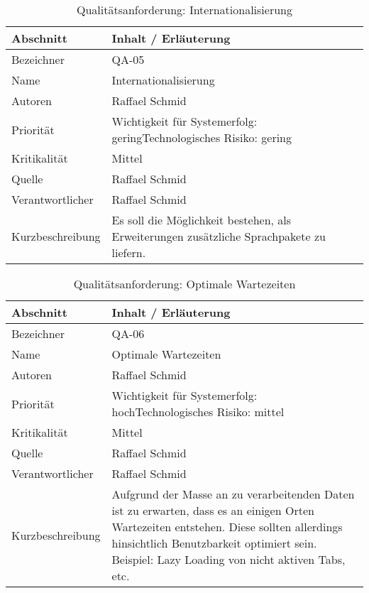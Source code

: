 \begin{longtable}{|p{4cm}|p{10.5cm}|}
    \caption{Qualitätsanforderung: Internationalisierung}\\\hline
   \textbf{Abschnitt} & \textbf{Inhalt / Erläuterung} \\\hline
   Bezeichner & QA-05\\\hline
   Name & Internationalisierung\\\hline
   Autoren & Raffael Schmid\\\hline
   Priorität & Wichtigkeit für Systemerfolg: gering\newline Technologisches Risiko: gering\\\hline
   Kritikalität & Mittel\\\hline
   Quelle & Raffael Schmid\\\hline
   Verantwortlicher & Raffael Schmid\\\hline
   Kurzbeschreibung & Es soll die Möglichkeit bestehen, als Erweiterungen zusätzliche Sprachpakete zu liefern.\\\hline
\end{longtable}

\begin{longtable}{|p{4cm}|p{10.5cm}|}
    \caption{Qualitätsanforderung: Optimale Wartezeiten}\\\hline
   \textbf{Abschnitt} & \textbf{Inhalt / Erläuterung} \\\hline
   Bezeichner & QA-06\\\hline
   Name & Optimale Wartezeiten\\\hline
   Autoren & Raffael Schmid\\\hline
   Priorität & Wichtigkeit für Systemerfolg: hoch\newline Technologisches Risiko: mittel\\\hline
   Kritikalität & Mittel\\\hline
   Quelle & Raffael Schmid\\\hline
   Verantwortlicher & Raffael Schmid\\\hline
   Kurzbeschreibung & Aufgrund der Masse an zu verarbeitenden Daten ist zu erwarten, dass es an einigen Orten Wartezeiten entstehen. Diese sollten allerdings hinsichtlich Benutzbarkeit optimiert sein. Beispiel: Lazy Loading von nicht aktiven Tabs, etc.\\\hline
\end{longtable}

